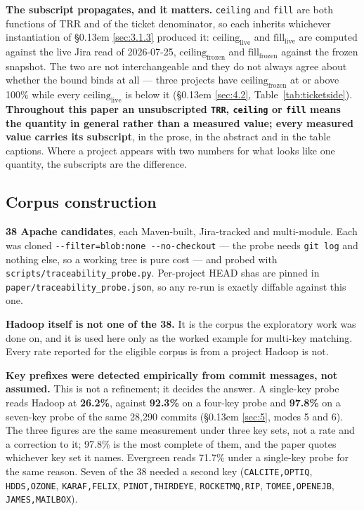 \documentclass[conference]{IEEEtran}
\begin{document}
\textbf{The subscript propagates, and it matters.} \texttt{ceiling} and \texttt{fill} are both functions of TRR and of the ticket denominator, so each inherits whichever instantiation of \S\kern0.13em \ref{sec:3.1.3} produced it: $\mathrm{ceiling}_\mathrm{live}$ and $\mathrm{fill}_\mathrm{live}$ are computed against the live Jira read of 2026-07-25, $\mathrm{ceiling}_\mathrm{frozen}$ and $\mathrm{fill}_\mathrm{frozen}$ against the frozen snapshot. The two are not interchangeable and they do not always agree about whether the bound binds at all --- three projects have $\mathrm{ceiling}_\mathrm{frozen}$ at or above 100\% while every $\mathrm{ceiling}_\mathrm{live}$ is below it (\S\kern0.13em \ref{sec:4.2}, Table~\ref{tab:ticketside}). \textbf{Throughout this paper an unsubscripted \texttt{TRR}, \texttt{ceiling} or \texttt{fill} means the quantity in general rather than a measured value; every measured value carries its subscript}, in the prose, in the abstract and in the table captions. Where a project appears with two numbers for what looks like one quantity, the subscripts are the difference.

\subsection{Corpus construction}
\label{sec:3.2}

\textbf{38 Apache candidates}, each Maven-built, Jira-tracked and multi-module. Each was cloned \texttt{-\allowbreak{}-\allowbreak{}filter=blob:none -\allowbreak{}-\allowbreak{}no-\allowbreak{}checkout} --- the probe needs \texttt{git log} and nothing else, so a working tree is pure cost --- and probed with \texttt{scripts/\allowbreak{}traceability\_\allowbreak{}probe.\allowbreak{}py}. Per-project HEAD shas are pinned in \texttt{paper/\allowbreak{}traceability\_\allowbreak{}probe.\allowbreak{}json}, so any re-run is exactly diffable against this one.

\textbf{Hadoop itself is not one of the 38.} It is the corpus the exploratory work was done on, and it is used here only as the worked example for multi-key matching. Every rate reported for the eligible corpus is from a project Hadoop is not.

\textbf{Key prefixes were detected empirically from commit messages, not assumed.} This is not a refinement; it decides the answer. A single-key probe reads Hadoop at \textbf{26.2\%}, against \textbf{92.3\%} on a four-key probe and \textbf{97.8\%} on a seven-key probe of the same 28,290 commits (\S\kern0.13em \ref{sec:5}, modes 5 and 6). The three figures are the same measurement under three key sets, not a rate and a correction to it; 97.8\% is the most complete of them, and the paper quotes whichever key set it names. Evergreen reads 71.7\% under a single-key probe for the same reason. Seven of the 38 needed a second key (\texttt{CALCITE,OPTIQ}, \texttt{HDDS,OZONE}, \texttt{KARAF,FELIX}, \texttt{PINOT,THIRDEYE}, \texttt{ROCKETMQ,RIP}, \texttt{TOMEE,OPENEJB}, \texttt{JAMES,MAILBOX}).
\end{document}
